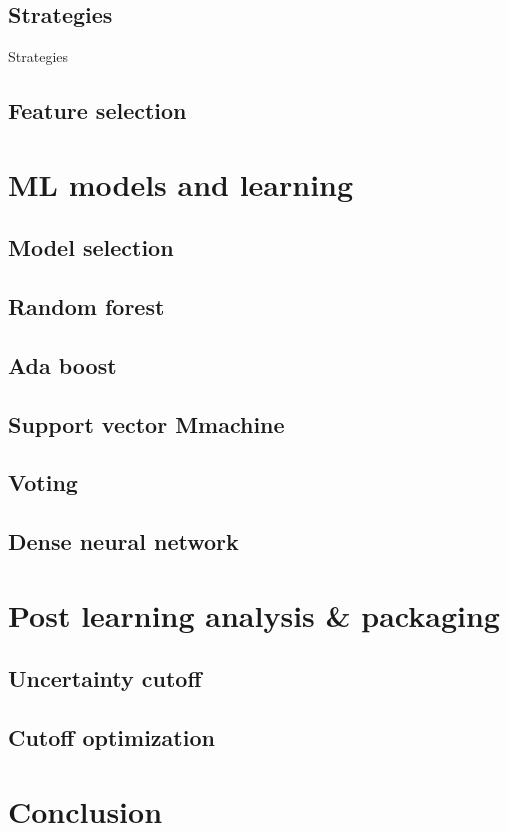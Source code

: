 \documentclass[preprint,aps,nofootinbib,a4paper,superscriptaddress,longbibliography,amsfonts,amssymb,amsmath,titlepage]{revtex4-2}
\begin{document}
\subsection{Strategies}
Strategies

\subsection{Feature selection}

\section{ML models and learning}


\subsection{Model selection}


\subsection{Random forest}


\subsection{Ada boost}


\subsection{Support vector Mmachine}


\subsection{Voting}


\subsection{Dense neural network}

\section{Post learning analysis \& packaging}


\subsection{Uncertainty cutoff}


\subsection{Cutoff optimization}


\section{Conclusion}

\end{document}

